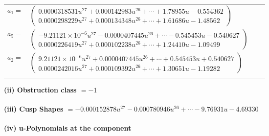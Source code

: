\documentclass[1p]{elsarticle_modified}
\theoremstyle{definition}
\begin{document}
\begin{tabular}{m{7pt} m{180pt} m{7pt} m{180pt} }
\flushright $a_{1}=$&$\begin{pmatrix}0.0000318531 u^{27}+0.000142983 u^{26}+\cdots+1.78955 u-0.554362\\0.0000298229 u^{27}+0.000134348 u^{26}+\cdots+1.61686 u-1.48562\end{pmatrix}$ \\
\flushright $a_{5}=$&$\begin{pmatrix}-9.21121\times10^{-6} u^{27}-0.0000407445 u^{26}+\cdots-0.545453 u-0.540627\\0.0000226419 u^{27}+0.000102238 u^{26}+\cdots+1.24410 u-1.09499\end{pmatrix}$ \\
\flushright $a_{2}=$&$\begin{pmatrix}9.21121\times10^{-6} u^{27}+0.0000407445 u^{26}+\cdots+0.545453 u+0.540627\\0.0000242016 u^{27}+0.000109392 u^{26}+\cdots+1.30651 u-1.19282\end{pmatrix}$\\&\end{tabular}
\flushleft \textbf{(ii) Obstruction class $= -1$}\\~\\
\flushleft \textbf{(iii) Cusp Shapes $= -0.000152878 u^{27}-0.000780946 u^{26}+\cdots-9.76931 u-4.69330$}\\~\\
\newpage\renewcommand{\arraystretch}{1}
\flushleft \textbf{(iv) u-Polynomials at the component}\newline \\
\end{document}
